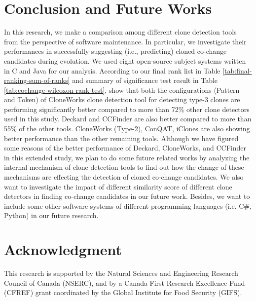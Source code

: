 \documentclass[review]{elsarticle}
\begin{document}
\section{Conclusion and Future Works}
\label{the-conclusion-cochange}
In this research, we make a comparison among different clone detection tools from the perspective of software maintenance. In particular, we investigate their performances in successfully suggesting (i.e., predicting) cloned co-change candidates during evolution. We used eight open-source subject systems written in C and Java for our analysis. According to our final rank list in Table \ref{tab:final-ranking-sum-of-ranks} and summary of significance test result in Table \ref{tab:cochange-wilcoxon-rank-test}, show that both the configurations (Pattern and Token) of CloneWorks clone detection tool for detecting type-3 clones are performing significantly better compared to more than 72\% other clone detectors used in this study. Deckard and CCFinder are also better compared to more than 55\% of the other tools. CloneWorks (Type-2), ConQAT, iClones are also showing better performance than the other remaining tools. Although we have figured some reasons of the better performance of Deckard, CloneWorks, and CCFinder in this extended study, we plan to do some future related works by analyzing the internal mechanism of clone detection tools to find out how the change of these mechanisms are effecting the detection of cloned co-change candidates. We also want to investigate the impact of different similarity score of different clone detectors in finding co-change candidates in our future work. Besides, we want to include some other software systems of different programming languages (i.e. C\#, Python) in our future research.

\section*{Acknowledgment}
This research is supported by the Natural Sciences and Engineering Research Council of Canada (NSERC), and by a Canada First Research Excellence Fund (CFREF) grant coordinated by the Global Institute for Food Security (GIFS).




\end{document}

